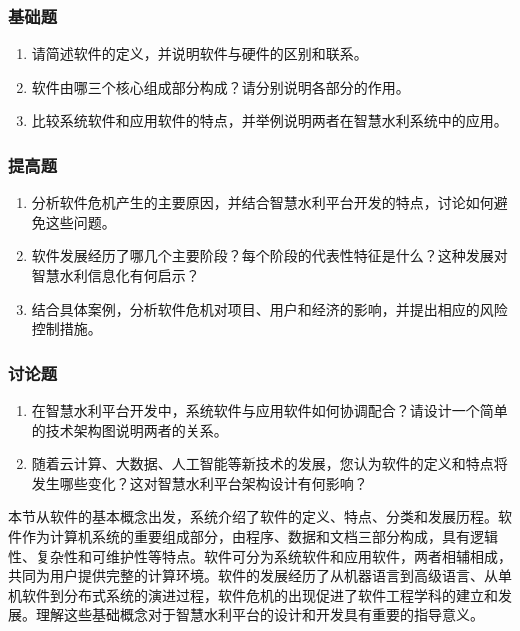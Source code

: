 \documentclass[12pt,a4paper]{article}
\providecommand{\tightlist}{%
  \setlength{\itemsep}{0pt}\setlength{\parskip}{0pt}}
\begin{document}
\subsubsection{基础题}\label{ux57faux7840ux9898}

\begin{enumerate}
\def\labelenumi{\arabic{enumi}.}
\tightlist
\item
  请简述软件的定义，并说明软件与硬件的区别和联系。
\item
  软件由哪三个核心组成部分构成？请分别说明各部分的作用。
\item
  比较系统软件和应用软件的特点，并举例说明两者在智慧水利系统中的应用。
\end{enumerate}

\subsubsection{提高题}\label{ux63d0ux9ad8ux9898}

\begin{enumerate}
\def\labelenumi{\arabic{enumi}.}
\setcounter{enumi}{3}
\tightlist
\item
  分析软件危机产生的主要原因，并结合智慧水利平台开发的特点，讨论如何避免这些问题。
\item
  软件发展经历了哪几个主要阶段？每个阶段的代表性特征是什么？这种发展对智慧水利信息化有何启示？
\item
  结合具体案例，分析软件危机对项目、用户和经济的影响，并提出相应的风险控制措施。
\end{enumerate}

\subsubsection{讨论题}\label{ux8ba8ux8bbaux9898}

\begin{enumerate}
\def\labelenumi{\arabic{enumi}.}
\setcounter{enumi}{6}
\tightlist
\item
  在智慧水利平台开发中，系统软件与应用软件如何协调配合？请设计一个简单的技术架构图说明两者的关系。
\item
  随着云计算、大数据、人工智能等新技术的发展，您认为软件的定义和特点将发生哪些变化？这对智慧水利平台架构设计有何影响？
\end{enumerate}

本节从软件的基本概念出发，系统介绍了软件的定义、特点、分类和发展历程。软件作为计算机系统的重要组成部分，由程序、数据和文档三部分构成，具有逻辑性、复杂性和可维护性等特点。软件可分为系统软件和应用软件，两者相辅相成，共同为用户提供完整的计算环境。软件的发展经历了从机器语言到高级语言、从单机软件到分布式系统的演进过程，软件危机的出现促进了软件工程学科的建立和发展。理解这些基础概念对于智慧水利平台的设计和开发具有重要的指导意义。
\end{document}
